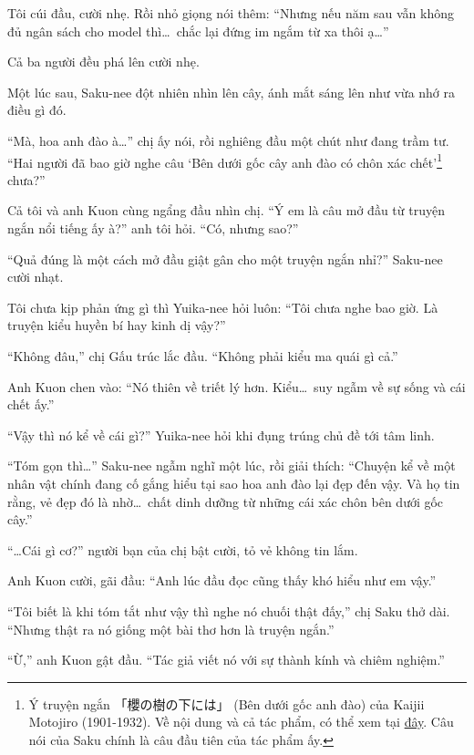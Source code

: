 \documentclass[../main.tex]{subfiles}
\begin{document}
Tôi cúi đầu, cười nhẹ. Rồi nhỏ giọng nói thêm: ``Nhưng nếu năm sau vẫn không đủ ngân sách cho model thì\dots\ chắc lại đứng im ngắm từ xa thôi ạ\dots''

Cả ba người đều phá lên cười nhẹ.

\ct

Một lúc sau, Saku-nee đột nhiên nhìn lên cây, ánh mắt sáng lên như vừa nhớ ra điều gì đó.

``Mà, hoa anh đào à\dots'' chị ấy nói, rồi nghiêng đầu một chút như đang trầm tư. ``Hai người đã bao giờ nghe câu `Bên dưới gốc cây anh đào có chôn xác chết'\footnote{Ý truyện ngắn 「櫻の樹の下には」 (Bên dưới gốc anh đào) của Kaijii Motojiro (1901-1932). Về nội dung và cả tác phẩm, có thể xem tại \href{https://spiderum.com/bai-dang/Mot-truyen-kinh-di-Ben-duoi-goc-anh-dao-82a}{đây}. Câu nói của Saku chính là câu đầu tiên của tác phẩm ấy.} chưa?''


Cả tôi và anh Kuon cùng ngẩng đầu nhìn chị. ``Ý em là câu mở đầu từ truyện ngắn nổi tiếng ấy à?'' anh tôi hỏi. ``Có, nhưng sao?''

``Quả đúng là một cách mở đầu giật gân cho một truyện ngắn nhỉ?'' Saku-nee cười nhạt.

Tôi chưa kịp phản ứng gì thì Yuika-nee hỏi luôn: ``Tôi chưa nghe bao giờ. Là truyện kiểu huyền bí hay kinh dị vậy?''

``Không đâu,'' chị Gấu trúc lắc đầu. ``Không phải kiểu ma quái gì cả.''

Anh Kuon chen vào: ``Nó thiên về triết lý hơn. Kiểu\dots\ suy ngẫm về sự sống và cái chết ấy.''

``Vậy thì nó kể về cái gì?'' Yuika-nee hỏi khi đụng trúng chủ đề tới tâm linh.


``Tóm gọn thì\dots'' Saku-nee ngẫm nghĩ một lúc, rồi giải thích: ``Chuyện kể về một nhân vật chính đang cố gắng hiểu tại sao hoa anh đào lại đẹp đến vậy. Và họ tin rằng, vẻ đẹp đó là nhờ\dots\ chất dinh dưỡng từ những cái xác chôn bên dưới gốc cây.''

``\dots Cái gì cơ?'' người bạn của chị bật cười, tỏ vẻ không tin lắm.

Anh Kuon cười, gãi đầu: ``Anh lúc đầu đọc cũng thấy khó hiểu như em vậy.''

``Tôi biết là khi tóm tắt như vậy thì nghe nó chuối thật đấy,'' chị Saku thở dài. ``Nhưng thật ra nó giống một bài thơ hơn là truyện ngắn.''

``Ừ,'' anh Kuon gật đầu. ``Tác giả viết nó với sự thành kính và chiêm nghiệm.''
\end{document}
